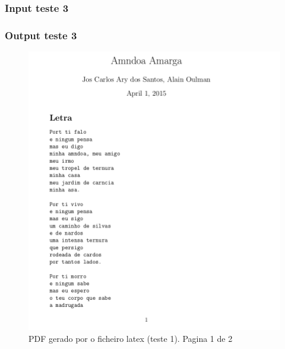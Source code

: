 \subsubsection{Input teste 3}
\label{seq:anex-music-test-in03}


\subsubsection{Output teste 3}
\label{seq:anex-music-test-out03}


\begin{figure}
\centering
\includegraphics[width=15cm]{anexos/2-5/2-5-a-img1.png}
\caption{PDF gerado por o ficheiro latex (teste 1). Pagina 1 de 2}
\end{figure}

